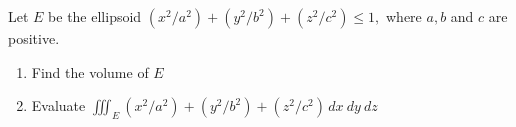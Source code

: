 Let $E$ be the ellipsoid $(x^2 / a^2) + (y^2 / b^2) + (z^2 / c^2) \leq 1,$ where $a, b$ and $c$ are positive.

\begin{enumerate}[label=(\alph*), itemsep=0.4em, topsep=0.5em]
	\item Find the volume of $E$
	\item Evaluate $\displaystyle \iiint_E (x^2 / a^2) + (y^2 / b^2) + (z^2 / c^2)\, dx \ dy \ dz$
\end{enumerate}
